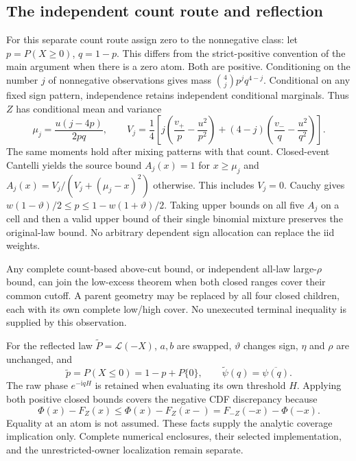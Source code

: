 \subsection{The independent count route and reflection}
For this separate count route assign zero to the nonnegative class:
let $p=P(X\ge0)$, $q=1-p$. This differs from the strict-positive
convention of the main argument when there is a zero atom. Both are positive. Conditioning on the
number $j$ of nonnegative observations gives mass $\binom4j p^jq^{4-j}$.
Conditional on any fixed sign pattern, independence retains independent
conditional marginals. Thus $Z$ has conditional mean and variance
\[
 \mu_j=\frac{u(j-4p)}{2pq},\qquad
 V_j=\frac14\left[j\left(\frac{v_+}{p}-\frac{u^2}{p^2}\right)
 +(4-j)\left(\frac{v_-}{q}-\frac{u^2}{q^2}\right)\right].
\]
The same moments hold after mixing patterns with that count. Closed-event
Cantelli yields the source bound $A_j(x)=1$ for $x\ge\mu_j$ and
$A_j(x)=V_j/(V_j+(\mu_j-x)^2)$ otherwise. This includes $V_j=0$.
Cauchy gives
$w(1-\vartheta)/2\le p\le1-w(1+\vartheta)/2$.
Taking upper bounds on all five $A_j$ on a cell and then a valid upper
bound of their single binomial mixture preserves the original-law bound.
No arbitrary dependent sign allocation can replace the iid weights.

Any complete count-based above-cut bound, or independent all-law
large-$\rho$ bound, can join the low-excess theorem when both closed
ranges cover their common cutoff. A parent geometry may be replaced by
all four closed children, each with its own complete low/high cover.
No unexecuted terminal inequality is supplied by this observation.

For the reflected law $\widetilde P=\mathcal L(-X)$, $a,b$ are swapped,
$\vartheta$ changes sign, $\eta$ and $\rho$ are unchanged, and
\[
 \widetilde p=P(X\le0)=1-p+P\{0\},\qquad
 \widetilde\psi(q)=\overline{\psi(q)}.
\]
The raw phase $e^{-\mathrm iqH}$ is retained when evaluating its own
threshold $H$. Applying both positive closed bounds covers the negative
CDF discrepancy because
\[
 \Phi(x)-F_Z(x)\le\Phi(x)-F_Z(x-)
     =F_{-Z}(-x)-\Phi(-x).
\]
Equality at an atom is not assumed. These facts supply the analytic
coverage implication only. Complete numerical enclosures, their selected
implementation, and the unrestricted-owner localization remain separate.

